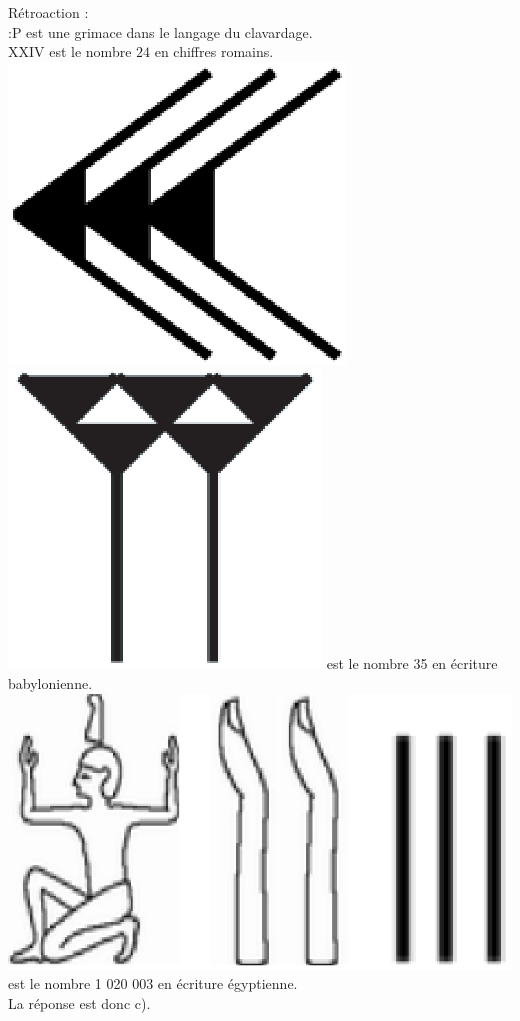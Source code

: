\documentclass[letterpaper, 12pt]{article}
\begin{document}
R\'etroaction :\\
:\textsf{P} est une grimace dans le langage du clavardage.\\
XXIV est le nombre $24$ en chiffres romains.\\
\includegraphics[scale=0.1]{30.eps} \includegraphics[scale=0.1]{5.eps} est le nombre 35 en \'ecriture babylonienne.\\
\includegraphics[scale=0.12]{nombregyptien.eps} est le nombre 1 020 003 en \'ecriture \'egyptienne.\\
La r\'eponse est donc c).\\
\end{document}
